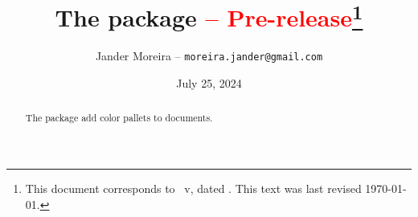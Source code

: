 \documentclass[a4paper, 11pt]{article}
\title{%
    The \PackageName{palettize} package \textcolor{red}{ -- Pre-release}\thanks{This document corresponds to \PackageName{palettize}~v\PLTVersion, dated \PLTDate. This text was last revised \today.}%
}
\author{Jander Moreira -- \texttt{moreira.jander@gmail.com}}
\date{July 25, 2024}
\begin{document}
\maketitle
\sloppy

\begin{abstract}
    The  package add color pallets to documents.
\end{abstract}

\tableofcontents


\VCPrintChanges


%
%
\end{document}
